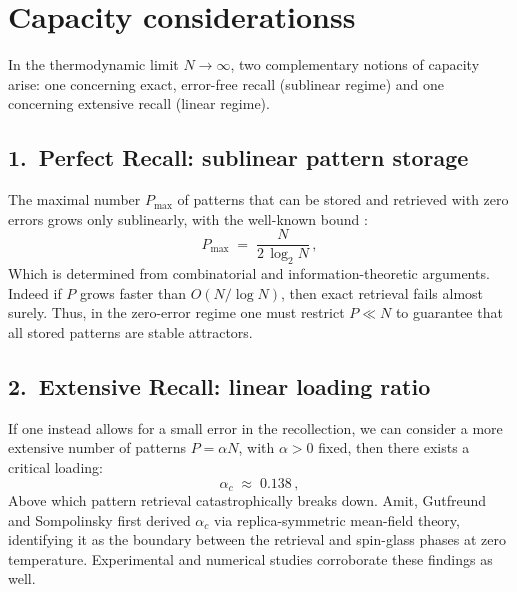 \documentclass[a4paper,12pt]{report}
\begin{document}
\section{Capacity considerationss}
In the thermodynamic limit \(N\to\infty\), two complementary notions of capacity 
arise:  one concerning exact, error-free recall (sublinear regime) and one concerning 
extensive recall (linear regime).  

\subsection*{1.\ Perfect Recall: sublinear pattern storage}

The maximal number \(P_{\max}\) of patterns that can be stored and retrieved with zero 
errors grows only sublinearly, with the well-known bound \cite{Hertz2018}:
\begin{equation}
  P_{\max}\;=\;\frac{N}{2\,\log_2 N}\,,
\end{equation}
Which is determined from combinatorial and information-theoretic arguments.  
Indeed if \(P\) grows faster than \(O(N/\log N)\), then exact retrieval fails almost 
surely.  Thus, in the zero-error regime one must restrict \(P\ll N\) to guarantee that 
all stored patterns are stable attractors.

\subsection*{2.\ Extensive Recall: linear loading ratio}

If one instead allows for a small error in the recollection, we can consider a more 
extensive number of patterns \(P=\alpha N\), with \(\alpha>0\) fixed, then there exists 
a critical loading:  
\begin{equation}\label{eq:alpha_c}
  \alpha_c \;\approx\; 0.138 \, ,
\end{equation}
Above which pattern retrieval catastrophically breaks down.  
Amit, Gutfreund and Sompolinsky \cite{PhysRevLett.55.1530, PhysRevA.35.2293, Amit1989} 
first derived \(\alpha_c\) via replica-symmetric mean-field theory, 
identifying it as the boundary between the retrieval and spin-glass phases at zero 
temperature.  
Experimental and numerical studies corroborate these findings as well.



\end{document}
